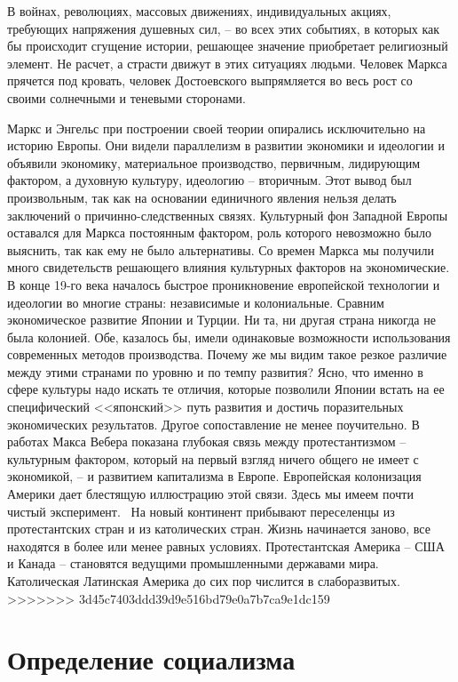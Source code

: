 \documentclass{book}
\begin{document}
В войнах, революциях, массовых движениях, индивидуаль­ных акциях, требующих напряжения душевных сил, -- во всех этих событиях, в которых как бы происходит сгущение истории, решающее значение приобретает религиозный элемент. Не расчет, а страсти движут в этих ситуациях людьми. Человек Маркса прячется под кровать, человек Достоевского выпрямляется во весь рост со своими солнечными и теневыми сторонами.

Маркс и Энгельс при построении своей теории опирались исключительно на историю Европы. Они видели параллелизм в развитии экономики и идеологии и объявили экономику, материальное производство, первичным, лидирующим фактором, а духовную культуру, идеологию -- вторичным. Этот вывод был произвольным, так как на основании единичного явле­ния нельзя делать заключений о причинно-следственных связях. Культурный фон Западной Европы оставался для Маркса постоянным фактором, роль которого невозможно было выяснить, так как ему не было альтернативы. Со времен Маркса мы получили много свидетельств решающего влияния культурных факторов на экономические. В конце 19-го века началось быстрое проникновение европейской технологии и идеологии во многие страны: независимые и колониальные. Сравним экономическое развитие Японии и Турции. Ни та, ни другая страна никогда не была колонией. Обе, казалось бы, имели оди­наковые возможности использования современных методов производства. Почему же мы видим такое резкое различие между 
этими странами по уровню и по темпу развития? Ясно, что именно в сфере культуры надо искать те отличия, которые позволили Японии встать на ее специфический <<японский>> путь развития и достичь поразительных экономических резуль­татов. Другое сопоставление не менее поучительно. В работах Макса Вебера показана глубокая связь между протестантиз­мом -- культурным фактором, который на первый взгляд ничего общего не имеет с экономикой, -- и развитием капита­лизма в Европе. Европейская колонизация Америки дает блес­тящую иллюстрацию этой связи. Здесь мы имеем почти чистый эксперимент.  На новый континент прибывают переселенцы из протестантских стран и из католических стран. Жизнь на­чинается заново, все находятся в более или менее равных усло­виях. Протестантская Америка -- США и Канада -- становятся ведущими промышленными державами мира. Католическая Латинская Америка до сих пор числится в слаборазвитых.
>>>>>>> 3d45c7403ddd39d9e516bd79e0a7b7ca9e1dc159


\section{Определение социализма}
\end{document}
